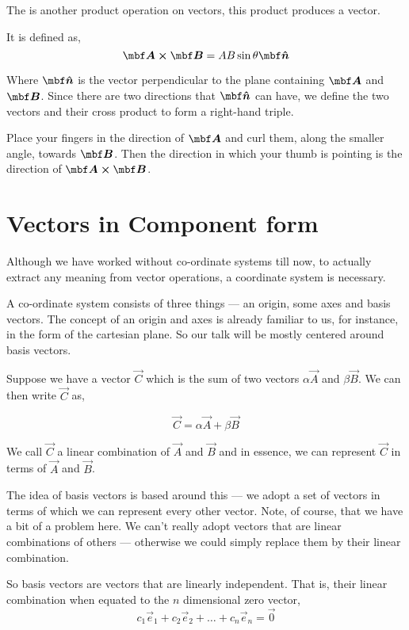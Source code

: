 The  is another product operation on vectors, this product produces a vector.

It is defined as, 
\[\Aa \cp \BB = AB\sin\theta \unitv{n}\] 

Where \(\unitv{n}\) is the vector perpendicular to the plane containing \(\Aa\) and \(\BB\).
Since there are two directions that \(\unitv{n}\) can have, we define the two vectors 
and their cross product to form a right-hand triple.

Place your fingers in the direction of \(\Aa\) and curl them, along the smaller angle, towards 
\(\BB\). Then the direction in which your thumb is pointing is the direction of \(\Aa \cp \BB\). 

\section{Vectors in Component form}

Although we have worked without co-ordinate systems till now,
to actually extract any meaning from vector operations, a coordinate system is necessary.

A co-ordinate system consists of three things --- an origin, some axes and basis vectors.
The concept of an origin and axes is already familiar to us, for instance, in the form of the cartesian plane.
So our talk will be mostly centered around basis vectors. 

Suppose we have a vector \(\vec{C}\) which is the sum of two vectors \(\alpha\vec{A}\) and 
\(\beta\vec{B}\). We can then write \(\vec{C}\) as,

\begin{equation*}
    \vec{C} = \alpha\vec{A} + \beta\vec{B}
\end{equation*}

We call \(\vec{C}\) a linear combination of \(\vec{A}\) and \(\vec{B}\) and in essence, 
we can represent \(\vec{C}\) in terms of \(\vec{A}\) and \(\vec{B}\). 

The idea of basis vectors is based around this --- we adopt a set of vectors in terms 
of which we can represent every other vector. Note, of course, that we have 
a bit of a problem here. We can't really adopt vectors that are linear combinations of 
others --- otherwise we could simply replace them by their linear combination.

So basis vectors are vectors that are linearly independent. That is,
their linear combination when equated to the \(n\) dimensional zero vector, 
\[
    c_1\vec{e}_1 + c_2\vec{e}_2 + \dots + c_n\vec{e}_n = \vec{0}\] 

